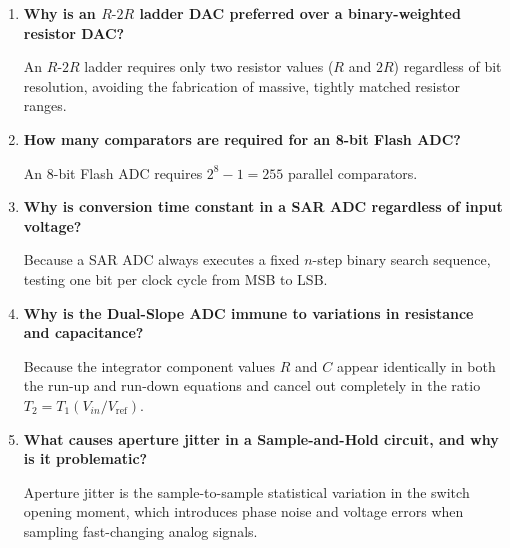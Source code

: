 \documentclass[12pt,a4paper]{article}
\newcommand{\Q}[1]{\textbf{#1}\par\noindent\ignorespaces}
\begin{document}
\begin{tcolorbox}[exambox, title={\textbf{Frequently Asked / Viva Questions}}]
\begin{enumerate}[topsep=0pt, label=\textbf{Q\arabic*.}, itemsep=5pt]
  \item \Q{Why is an $R\text{-}2R$ ladder DAC preferred over a binary-weighted resistor DAC?}
  An $R\text{-}2R$ ladder requires only two resistor values ($R$ and $2R$) regardless of bit resolution, avoiding the fabrication of massive, tightly matched resistor ranges.

  \item \Q{How many comparators are required for an 8-bit Flash ADC?}
  An 8-bit Flash ADC requires $2^8 - 1 = 255$ parallel comparators.

  \item \Q{Why is conversion time constant in a SAR ADC regardless of input voltage?}
  Because a SAR ADC always executes a fixed $n$-step binary search sequence, testing one bit per clock cycle from MSB to LSB.

  \item \Q{Why is the Dual-Slope ADC immune to variations in resistance and capacitance?}
  Because the integrator component values $R$ and $C$ appear identically in both the run-up and run-down equations and cancel out completely in the ratio $T_2 = T_1 (V_{in}/V_{\text{ref}})$.

  \item \Q{What causes aperture jitter in a Sample-and-Hold circuit, and why is it problematic?}
  Aperture jitter is the sample-to-sample statistical variation in the switch opening moment, which introduces phase noise and voltage errors when sampling fast-changing analog signals.
\end{enumerate}
\end{tcolorbox}
\end{document}
